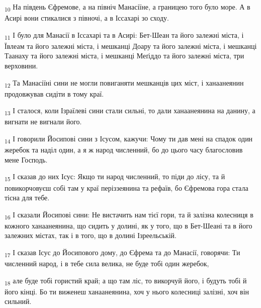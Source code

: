 \begin{tcolorbox}
\textsubscript{10} На південь Єфремове, а на північ Манасіїне, а границею того було море. А в Асирі вони стикалися з півночі, а в Іссахарі зо сходу.
\end{tcolorbox}
\begin{tcolorbox}
\textsubscript{11} І було для Манасії в Іссахарі та в Асирі: Бет-Шеан та його залежні міста, і Ївлеам та його залежні міста, і мешканці Доару та його залежні міста, і мешканці Таанаху та його залежні міста, і мешканці Меґіддо та його залежні міста, три верховини.
\end{tcolorbox}
\begin{tcolorbox}
\textsubscript{12} Та Манасіїні сини не могли повиганяти мешканців цих міст, і ханаанеянин продовжував сидіти в тому краї.
\end{tcolorbox}
\begin{tcolorbox}
\textsubscript{13} І сталося, коли Ізраїлеві сини стали сильні, то дали ханаанеянина на данину, а вигнати не вигнали його.
\end{tcolorbox}
\begin{tcolorbox}
\textsubscript{14} І говорили Йосипові сини з Ісусом, кажучи: Чому ти дав мені на спадок один жеребок та наділ один, а я ж народ численний, бо до цього часу благословив мене Господь.
\end{tcolorbox}
\begin{tcolorbox}
\textsubscript{15} І сказав до них Ісус: Якщо ти народ численний, то піди до лісу, та й повикорчовуєш собі там у краї періззеянина та рефаїв, бо Єфремова гора стала тісна для тебе.
\end{tcolorbox}
\begin{tcolorbox}
\textsubscript{16} І сказали Йосипові сини: Не вистачить нам тієї гори, та й залізна колесниця в кожного ханаанеянина, що сидить у долині, як у того, що в Бет-Шеані та в його залежних містах, так і в того, що в долині Ізреельській.
\end{tcolorbox}
\begin{tcolorbox}
\textsubscript{17} І сказав Ісус до Йосипового дому, до Єфрема та до Манасії, говорячи: Ти численний народ, і в тебе сила велика, не буде тобі один жеребок,
\end{tcolorbox}
\begin{tcolorbox}
\textsubscript{18} але буде тобі гористий край; а що там ліс, то викорчуй його, і будуть тобі й його кінці. Бо ти виженеш ханаанеянина, хоч у нього колесниці залізні, хоч він сильний.
\end{tcolorbox}
